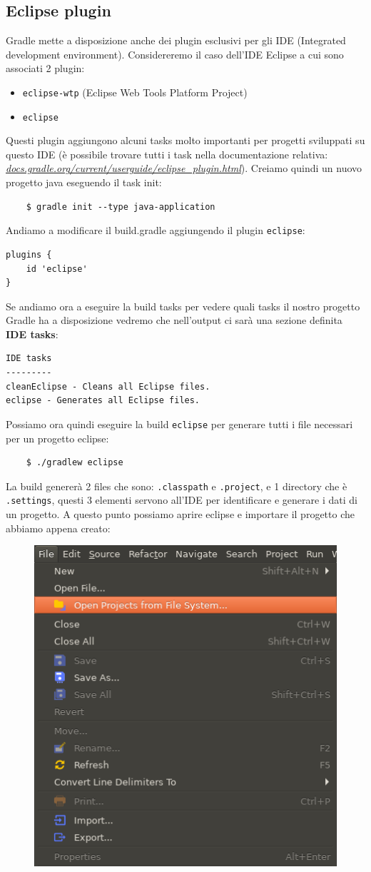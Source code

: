 \subsection{Eclipse plugin}
Gradle mette a disposizione anche dei plugin esclusivi per gli IDE (Integrated development environment). Considereremo il caso dell'IDE Eclipse a cui sono associati 2 plugin:
\begin{itemize}
    \item \texttt{eclipse-wtp} (Eclipse Web Tools Platform Project)
    \item \texttt{eclipse}
\end{itemize}
Questi plugin aggiungono alcuni tasks molto importanti per progetti sviluppati su questo IDE (è possibile trovare tutti i task nella documentazione relativa: \textit{\href{https://docs.gradle.org/current/userguide/eclipse\_plugin.html\#sec:eclipse\_tasks}{docs.gradle.org/current/userguide/eclipse\_plugin.html}}). Creiamo quindi un nuovo progetto java eseguendo il task init:
\begin{verbatim}
    $ gradle init --type java-application\end{verbatim}
Andiamo a modificare il build.gradle aggiungendo il plugin \texttt{eclipse}:
 \begin{lstlisting}[frame=single]
plugins {
    id 'eclipse'
} \end{lstlisting}
Se andiamo ora a eseguire la build tasks per vedere quali tasks il nostro progetto Gradle ha a disposizione vedremo che nell'output ci sarà una sezione definita \textbf{IDE tasks}:
\begin{verbatim}
IDE tasks
---------
cleanEclipse - Cleans all Eclipse files.
eclipse - Generates all Eclipse files. \end{verbatim}
Possiamo ora quindi eseguire la build \texttt{eclipse} per generare tutti i file necessari per un progetto eclipse:
\begin{verbatim}
    $ ./gradlew eclipse\end{verbatim}
La build genererà 2 files che sono: \texttt{.classpath} e \texttt{.project}, e 1 directory che è \texttt{.settings}, questi 3 elementi servono all'IDE per identificare e generare i dati di un progetto. A questo punto possiamo aprire eclipse e importare il progetto che abbiamo appena creato:
\begin{figure}[H]
    \centering
    \includegraphics[width=0.4\linewidth]{3DependencyManagement/eclipsePlugin/openProject.png}
\end{figure}
